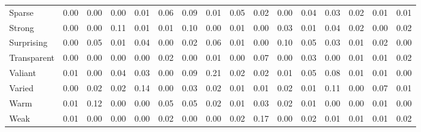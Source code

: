 \documentclass[
]{article}
\newenvironment{lltable}{\begin{landscape}\begin{center}\begin{ThreePartTable}}{\end{ThreePartTable}\end{center}\end{landscape}}
\begin{document}
\begin{lltable}
{\begin{longtable}{llllllllllllllll}
Sparse & 0.00 & 0.00 & 0.00 & 0.01 & 0.06 & 0.09 & 0.01 & 0.05 & 0.02 & 0.00 & 0.04 & 0.03 & 0.02 & 0.01 & 0.01\\
Strong & 0.00 & 0.00 & 0.11 & 0.01 & 0.01 & 0.10 & 0.00 & 0.01 & 0.00 & 0.03 & 0.01 & 0.04 & 0.02 & 0.00 & 0.02\\
Surprising & 0.00 & 0.05 & 0.01 & 0.04 & 0.00 & 0.02 & 0.06 & 0.01 & 0.00 & 0.10 & 0.05 & 0.03 & 0.01 & 0.02 & 0.00\\
Transparent & 0.00 & 0.00 & 0.00 & 0.00 & 0.02 & 0.00 & 0.01 & 0.00 & 0.07 & 0.00 & 0.03 & 0.00 & 0.01 & 0.01 & 0.02\\
Valiant & 0.01 & 0.00 & 0.04 & 0.03 & 0.00 & 0.09 & 0.21 & 0.02 & 0.02 & 0.01 & 0.05 & 0.08 & 0.01 & 0.01 & 0.00\\
Varied & 0.00 & 0.02 & 0.02 & 0.14 & 0.00 & 0.03 & 0.02 & 0.01 & 0.01 & 0.02 & 0.01 & 0.11 & 0.00 & 0.07 & 0.01\\
Warm & 0.01 & 0.12 & 0.00 & 0.00 & 0.05 & 0.05 & 0.02 & 0.01 & 0.03 & 0.02 & 0.01 & 0.00 & 0.00 & 0.01 & 0.00\\
Weak & 0.01 & 0.00 & 0.00 & 0.00 & 0.02 & 0.00 & 0.00 & 0.02 & 0.17 & 0.00 & 0.02 & 0.01 & 0.01 & 0.01 & 0.02\\
\bottomrule
\end{longtable}

}

\end{lltable}
\end{document}
